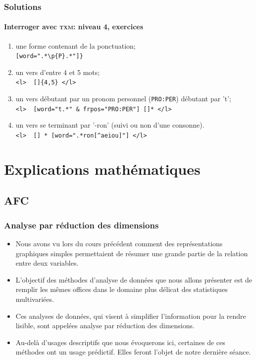 \documentclass{beamer}
\begin{document}
\begin{frame}[fragile]
\frametitle{Solutions}
\framesubtitle{Interroger avec \textsc{txm}: niveau 4, exercices}

\begin{enumerate}
	\item une forme contenant de la ponctuation;\\
	\verb|[word=".*\p{P}.*"]}|
	\item un vers d'entre 4 et 5 mots;\\
	\verb|<l>  []{4,5} </l>|
	\item un vers débutant par un pronom personnel (\texttt{PRO:PER}) débutant par 't';\\
	\verb|<l>  [word="t.*" & frpos="PRO:PER"] []* </l>|
	\item un vers se terminant par '-ron' (suivi ou non d'une consonne).\\
	\verb|<l>  [] * [word=".*ron[^aeiou]"] </l>|
\end{enumerate}

\end{frame}


\section{Explications mathématiques}
\subsection{AFC}



\begin{frame}[fragile]
\frametitle{Analyse par réduction des dimensions}

\begin{itemize}
	\item Nous avons vu lors du cours précédent comment des représentations graphiques simples permettaient de résumer une grande partie de la relation entre deux variables.
	\item L'objectif des méthodes d'analyse de données que nous allons présenter est de remplir les mêmes offices dans le domaine plus délicat des statistiques multivariées.
	\item Ces analyses de données, qui visent à simplifier l'information pour la rendre lisible, sont appelées \alert{analyse par réduction des dimensions}.
	\item Au-delà d'usages descriptifs que nous évoquerons ici, certaines de ces méthodes ont un usage prédictif. Elles feront l'objet de notre dernière séance.
\end{itemize}

\end{frame}
\end{document}
